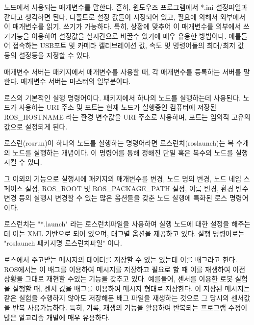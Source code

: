 \begin{definition}\label{def:RosParameter}
노드에서 사용되는 매개변수를 말한다. 흔히, 윈도우즈 프로그램에서 *.ini 설정파일과 같다고 생각하면 된다. 디폴트로 설정 값들이 지정되어 있고, 필요에 의해서 외부에서 이 매개변수를 읽기, 쓰기가 가능하다. 특히, 상황에 맞추어 이 매개변수를 외부에서 쓰기기능을 이용하여 설정값을 실시간으로 바꿀수 있기에 매우 유용한 방법이다. 예를들어 접속하는 USB포트 및 카메라 캘리브레이션 값, 속도 및 명령어들의 최대/최저 값 등의 설정등을 지정할 수 있다.
\end{definition}

\begin{definition}\label{def:RosParameterServer}
매개변수 서버는 패키지에서 매개변수를 사용할 때, 각 매개변수를 등록하는 서버를 말한다. 매개변수 서버는 마스터의 일부분이다. 
\end{definition}

\begin{definition}[rosrun]\label{def:RosRun}
로스의 기본적인 실행 명령어이다. 패키지에서 하나의 노드를 실행하는데 사용된다. 노드가 사용하는 URI 주소 및 포트는 현재 노드가 실행중인 컴퓨터에 저장된 ROS\_HOSTNAME 라는 환경 변수값을 URI 주소로 사용하며, 포트는 임의적 고유의 값으로 설정되게 된다.
\end{definition}

\begin{definition}[roslaunch]\label{def:RosLaunch}
로스런(rosrun)이 하나의 노드를 실행하는 명령어라면 로스런치(roslaunch)는 복 수개의 노드를 실행하는 개념이다. 이 명령어를 통해 정해진 단일 혹은 복수의 노드를 실행시킬 수 있다. 

그 이외의 기능으로 실행시에 패키지의 매개변수를 변경, 노드 명의 변경, 노드 네임 스페이스 설정, ROS\_ROOT 및 ROS\_PACKAGE\_PATH 설정, 이름 변경, 환경 변수 변경 등의 실행시 변경할 수 있는 많은 옵션들을 갖춘 노드 실행에 특화된 로스 명령어이다. 

로스런치는 "*.launch" 라는 로스런치파일을 사용하여 실행 노드에 대한 설정을 해주는데 이는 XML 기반으로 되어 있으며, 태그별 옵션을 제공하고 있다. 실행 명령어로는 "roslaunch 패키지명 로스런치파일" 이다.
\end{definition}

\begin{definition}[배그(bag)]\label{def:RosBag}
로스에서 주고받는 메시지의 데이터를 저장할 수 있는 있는데 이를 배그라고 한다. ROS에서는 이 배그를 이용하여 메시지를 저장하고 필요로 할 때 이를 재생하여 이전 상황을 그대로 재현할 수있는 기능을 갖추고 있다. 예를들어, 센서를 이용한 로봇 실험을 실행할 때, 센서 값을 배그를 이용하여 메시지 형태로 저장한다. 이 저장된 메시지는 같은 실험을 수행하지 않아도 저장해둔 배그 파일을 재생하는 것으로 그 당시의 센서값을 반복 사용가능하다. 특히, 기록, 재생의 기능을 활용하여 반복되는 프로그램 수정이 많은 알고리즘 개발에 매우 유용하다. 
\end{definition}

